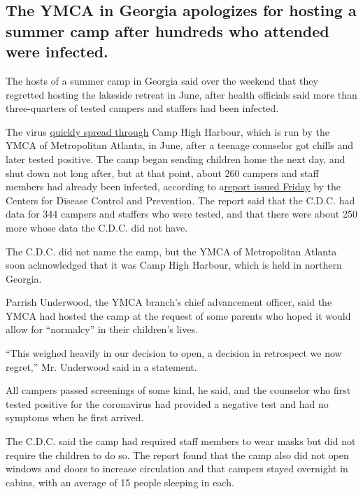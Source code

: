 \hypertarget{the-ymca-in-georgia-apologizes-for-hosting-a-summer-camp-after-hundreds-who-attended-were-infected}{%
\subsection{The YMCA in Georgia apologizes for hosting a summer camp
after hundreds who attended were
infected.}\label{the-ymca-in-georgia-apologizes-for-hosting-a-summer-camp-after-hundreds-who-attended-were-infected}}

The hosts of a summer camp in Georgia said over the weekend that they
regretted hosting the lakeside retreat in June, after health officials
said more than three-quarters of tested campers and staffers had been
infected.

The virus
\href{https://www.nytimes.com/2020/07/31/health/coronavirus-children-camp.html}{quickly
spread through} Camp High Harbour, which is run by the YMCA of
Metropolitan Atlanta, in June, after a teenage counselor got chills and
later tested positive. The camp began sending children home the next
day, and shut down not long after, but at that point, about 260 campers
and staff members had already been infected, according to
a\href{https://www.cdc.gov/mmwr/volumes/69/wr/mm6931e1.htm?s_cid=mm6931e1_w}{report
issued Friday} by the Centers for Disease Control and Prevention. The
report said that the C.D.C. had data for 344 campers and staffers who
were tested, and that there were about 250 more whose data the C.D.C.
did not have.

The C.D.C. did not name the camp, but the YMCA of Metropolitan Atlanta
soon acknowledged that it was Camp High Harbour, which is held in
northern Georgia.

Parrish Underwood, the YMCA branch's chief advancement officer, said the
YMCA had hosted the camp at the request of some parents who hoped it
would allow for ``normalcy'' in their children's lives.

``This weighed heavily in our decision to open, a decision in retrospect
we now regret,'' Mr. Underwood said in a statement.

All campers passed screenings of some kind, he said, and the counselor
who first tested positive for the coronavirus had provided a negative
test and had no symptoms when he first arrived.

The C.D.C. said the camp had required staff members to wear masks but
did not require the children to do so. The report found that the camp
also did not open windows and doors to increase circulation and that
campers stayed overnight in cabins, with an average of 15 people
sleeping in each.

